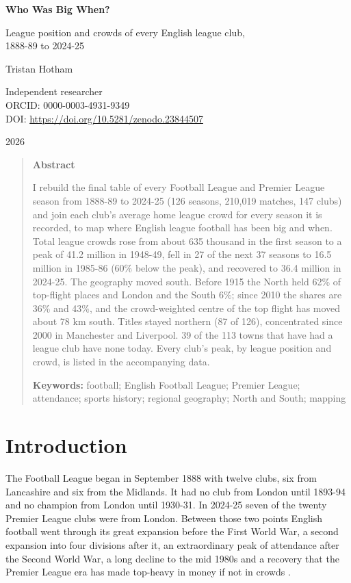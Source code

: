 \documentclass[11pt,a4paper]{article}
\begin{document}
\begin{center}
{\Large\bfseries Who Was Big When?\par}
\vspace{0.4em}
{\large League position and crowds of every English league club,\\1888-89 to 2024-25\par}
\vspace{1.2em}
{\large Tristan Hotham\par}
\vspace{0.3em}
{\small Independent researcher\\
ORCID: 0000-0003-4931-9349\\
DOI: \href{https://doi.org/10.5281/zenodo.23844507}{https://doi.org/10.5281/zenodo.23844507}\par}
\vspace{0.8em}
2026
\end{center}

\begin{quote}
\small
\begin{center}\textbf{Abstract}\end{center}
I rebuild the final table of every Football League and Premier League season from 1888-89 to 2024-25 (126 seasons, 210,019 matches, 147 clubs) and join each club's average home league crowd for every season it is recorded, to map where English league football has been big and when. Total league crowds rose from about 635 thousand in the first season to a peak of 41.2 million in 1948-49, fell in 27 of the next 37 seasons to 16.5 million in 1985-86 (60\% below the peak), and recovered to 36.4 million in 2024-25. The geography moved south. Before 1915 the North held 62\% of top-flight places and London and the South 6\%; since 2010 the shares are 36\% and 43\%, and the crowd-weighted centre of the top flight has moved about 78 km south. Titles stayed northern (87 of 126), concentrated since 2000 in Manchester and Liverpool. 39 of the 113 towns that have had a league club have none today. Every club's peak, by league position and crowd, is listed in the accompanying data.

\textbf{Keywords:} football; English Football League; Premier League; attendance; sports history; regional geography; North and South; mapping
\end{quote}

\section{Introduction}
The Football League began in September 1888 with twelve clubs, six from Lancashire and six from the Midlands. It had no club from London until 1893-94 and no champion from London until 1930-31. In 2024-25 seven of the twenty Premier League clubs were from London. Between those two points English football went through its great expansion before the First World War, a second expansion into four divisions after it, an extraordinary peak of attendance after the Second World War, a long decline to the mid 1980s and a recovery that the Premier League era has made top-heavy in money if not in crowds \citep{russell,dobson,szymanski}.
\end{document}
